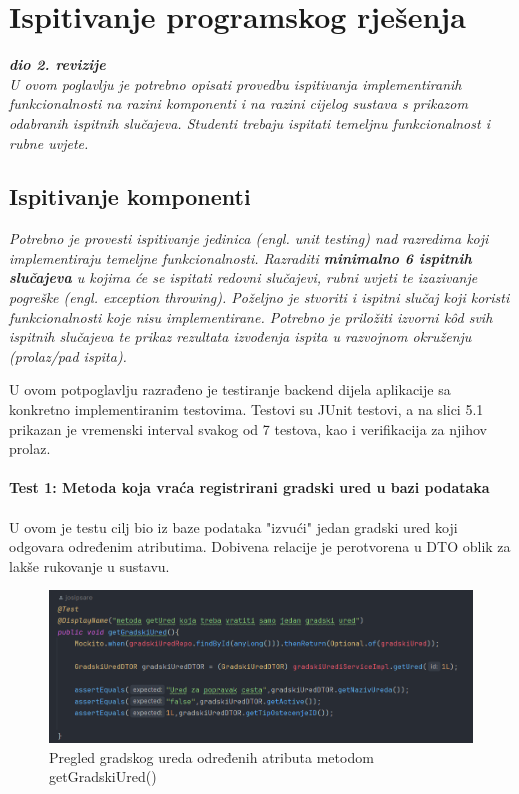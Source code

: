 	
		\section{Ispitivanje programskog rješenja}
			
			\textbf{\textit{dio 2. revizije}}\\
			
			 \textit{U ovom poglavlju je potrebno opisati provedbu ispitivanja implementiranih funkcionalnosti na razini komponenti i na razini cijelog sustava s prikazom odabranih ispitnih slučajeva. Studenti trebaju ispitati temeljnu funkcionalnost i rubne uvjete.}
	
			
			\subsection{Ispitivanje komponenti}
			\textit{Potrebno je provesti ispitivanje jedinica (engl. unit testing) nad razredima koji implementiraju temeljne funkcionalnosti. Razraditi \textbf{minimalno 6 ispitnih slučajeva} u kojima će se ispitati redovni slučajevi, rubni uvjeti te izazivanje pogreške (engl. exception throwing). Poželjno je stvoriti i ispitni slučaj koji koristi funkcionalnosti koje nisu implementirane. Potrebno je priložiti izvorni kôd svih ispitnih slučajeva te prikaz rezultata izvođenja ispita u razvojnom okruženju (prolaz/pad ispita). }
			
			U ovom potpoglavlju razrađeno je testiranje backend dijela aplikacije sa konkretno implementiranim testovima. Testovi su JUnit testovi, a na slici 5.1 prikazan je vremenski interval svakog od 7 testova, kao i verifikacija za njihov prolaz.\\
			\\
			\textbf{Test 1: Metoda koja vraća registrirani gradski ured u bazi podataka}\\
			\\ U ovom je testu cilj bio iz baze podataka "izvući" jedan gradski ured koji odgovara određenim atributima. Dobivena relacije je perotvorena u DTO oblik za lakše rukovanje u sustavu.\\
			\begin{figure}[H]
			\includegraphics[scale=0.4]{slike/getUred.PNG} %
			\centering
			\caption{Pregled gradskog ureda određenih atributa metodom getGradskiUred()}
			\label{fig:implementacija}
		\end{figure}
			
